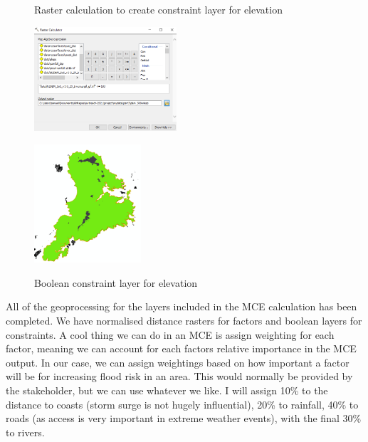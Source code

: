 \documentclass{article}
\begin{document}
\begin{figure}[h]
  \centering
  \begin{minipage}[b]{0.5\textwidth}
    \centering
    \caption{Raster calculation to create constraint layer for elevation}
    \includegraphics[width=200px]{images/part3/dem_500morless.PNG}
    \label{3_elevation}
  \end{minipage}
  \hfill
  \begin{minipage}[b]{0.4\textwidth}
    \centering
    \caption{Boolean constraint layer for elevation}
    \includegraphics[width=150px]{images/part3/dem_500morless_output.PNG}
    \label{3_elevation_output}
  \end{minipage}
\end{figure}

All of the geoprocessing for the layers included in the MCE calculation has been completed. We have normalised distance rasters for factors and boolean layers for constraints. A cool thing we can do in an MCE is assign weighting for each factor, meaning we can account for each factors relative importance in the MCE output. In our case, we can assign weightings based on how important a factor will be for increasing flood risk in an area. This would normally be provided by the stakeholder, but we can use whatever we like. I will assign 10\% to the distance to coasts (storm surge is not hugely influential), 20\% to rainfall, 40\% to roads (as access is very important in extreme weather events), with the final 30\% to rivers. \\
\end{document}
